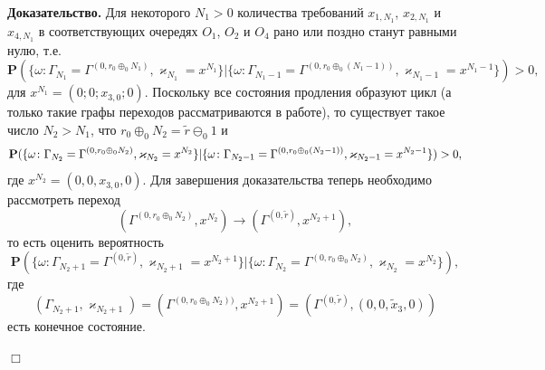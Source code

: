 \documentclass[12pt]{book}
\theoremstyle{plain}
\renewcommand{\Pr}{{\mathbf P}}
\theoremstyle{remark}
\theoremstyle{plain}
\theoremstyle{definition}
\renewenvironment{proof}{\indent\textbf{Доказательство. }}{\hfill$\Box$}
\begin{document}
\begin{proof}
Для некоторого $N_1>0$ количества требований $x_{1,  N_1}$,  $x_{2,  N_1}$ и $x_{4,  N_1}$ в соответствующих очередях $O_1$,  $O_2$ и $O_4$ рано или поздно станут равными нулю,  т.е. 
\begin{equation*}
\Pr (\{\omega\colon\Gamma_{N_1}=\Gamma^{(0,  r_0\oplus_{0}N_1)}, \varkappa_{N_1}=x^{N_1} \}| \{\omega\colon\Gamma_{N_1-1}=\Gamma^{(0,  r_0\oplus_{0}(N_1-1))},  \varkappa_{N_1-1}=x^{N_1-1}\}) > 0, 
\end{equation*}
для $x^{N_1} = \left(0; 0; x_{3,  0};0\right)$. Поскольку все состояния продления образуют цикл (а только такие графы переходов рассматриваются в работе),  то существует такое число $N_2>N_1$,  что $r_0 \oplus_0  N_2 = \tilde{r} \ominus_0 1$ и 
\begin{equation*}
\Pr (\{\omega\colon\Gamma_{N_2}=\Gamma^{(0,  r_0\oplus_{0} N_2)}, \varkappa_{N_2}=x^{N_2} \}|\\ \{\omega\colon\Gamma_{N_2-1}=\Gamma^{(0,  r_0\oplus_{0}(N_2-1))}, \varkappa_{N_2-1}=x^{N_2-1}\}) > 0, 
\end{equation*}
где $x^{N_2} = (0, 0, x_{3, 0}, 0)$.
Для завершения доказательства теперь необходимо рассмотреть переход
\begin{equation*}
 (\Gamma^{(0,  r_0\oplus_{0} N_2)},  x^{N_2})  \rightarrow (\Gamma^{(0,  \tilde{r})},  x^{N_2+1}), 
\end{equation*}
то есть оценить вероятность 
\begin{equation*}
\Pr (\{\omega\colon\Gamma_{N_2+1}=\Gamma^{(0,  \tilde{r})},  \varkappa_{N_2+1}= x^{N_2+1} \}| \{\omega\colon\Gamma_{N_2}=\Gamma^{(0,  r_0\oplus_{0}N_2)},  \varkappa_{N_2}=x^{N_2}\}), 
\end{equation*}
где 
$$(\Gamma_{N_2+1},  \varkappa_{N_2+1})= (\Gamma^{(0,  r_0\oplus_{0} N_2))},  x^{N_2+1}) = (\Gamma^{(0,  \tilde{r})} ,  (0,  0,  \tilde{x}_3,  0) )$$
есть конечное состояние.


\end{proof}
\end{document}
